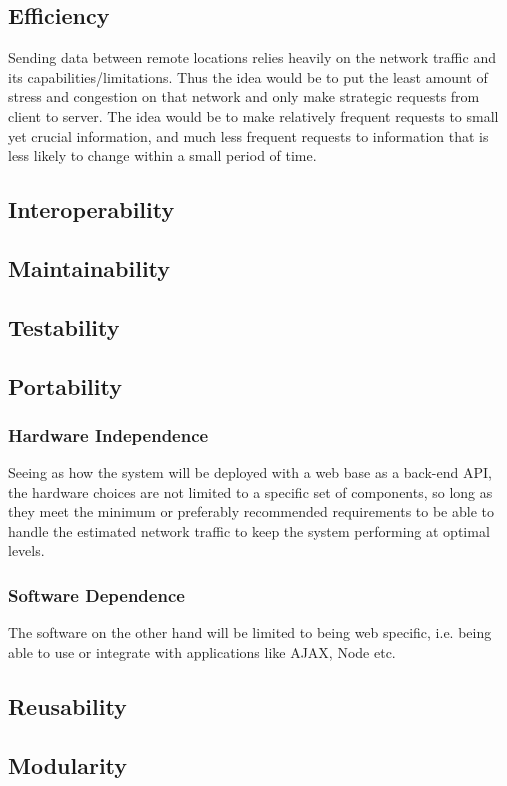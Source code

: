 \documentclass[11pt]{article}
\begin{document}
	\subsection{Efficiency}
	Sending data between remote locations relies heavily on the network traffic and its capabilities/limitations.  Thus the idea would be to put the least amount of stress and congestion on that network and only make strategic requests from client to server.  The idea would be to make relatively frequent requests to small yet crucial information, and much less frequent requests to information that is less likely to change within a small period of time.
	\subsection{Interoperability}
	\subsection{Maintainability}
	\subsection{Testability}
	\subsection{Portability}
	\subsubsection{Hardware Independence}
	Seeing as how the system will be deployed with a web base as a back-end API, the hardware choices are not limited to a specific set of components, so long as they meet the minimum or preferably recommended requirements to be able to handle the estimated network traffic to keep the system performing at optimal levels.
	\subsubsection{Software Dependence}
	The software on the other hand will be limited to being web specific, i.e. being able to use or integrate with applications like AJAX, Node etc.
	\subsection{Reusability}
	\subsection{Modularity}
\end{document}
